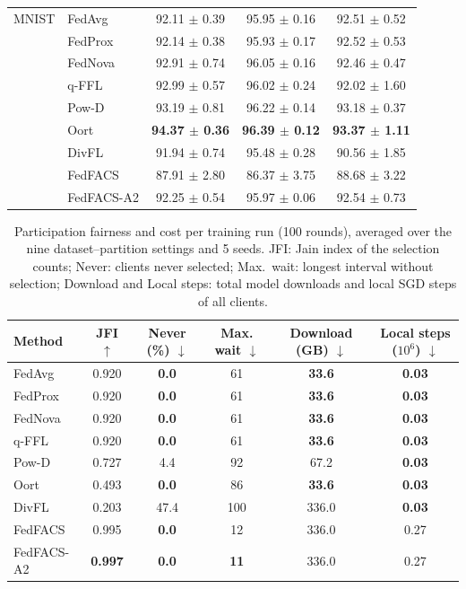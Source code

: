 \begin{table}[!htbp]
\begin{tabular*}{\journalfloatwidth}{@{\extracolsep{\fill}}llccc@{}}
\midrule
MNIST & FedAvg & 92.11 $\pm$ 0.39 & 95.95 $\pm$ 0.16 & 92.51 $\pm$ 0.52 \\
 & FedProx & 92.14 $\pm$ 0.38 & 95.93 $\pm$ 0.17 & 92.52 $\pm$ 0.53 \\
 & FedNova & 92.91 $\pm$ 0.74 & 96.05 $\pm$ 0.16 & 92.46 $\pm$ 0.47 \\
 & q-FFL & 92.99 $\pm$ 0.57 & 96.02 $\pm$ 0.24 & 92.02 $\pm$ 1.60 \\
 & Pow-D & 93.19 $\pm$ 0.81 & 96.22 $\pm$ 0.14 & 93.18 $\pm$ 0.37 \\
 & Oort & \textbf{94.37 $\pm$ 0.36} & \textbf{96.39 $\pm$ 0.12} & \textbf{93.37 $\pm$ 1.11} \\
 & DivFL & 91.94 $\pm$ 0.74 & 95.48 $\pm$ 0.28 & 90.56 $\pm$ 1.85 \\
 & FedFACS & 87.91 $\pm$ 2.80 & 86.37 $\pm$ 3.75 & 88.68 $\pm$ 3.22 \\
 & FedFACS-A2 & 92.25 $\pm$ 0.54 & 95.97 $\pm$ 0.06 & 92.54 $\pm$ 0.73 \\
\bottomrule
\end{tabular*}
\end{table}

\begin{table}[!htbp]
\centering\footnotesize\setlength{\tabcolsep}{3pt}\renewcommand{\arraystretch}{1.08}
\caption{Participation fairness and cost per training run (100 rounds), averaged over the nine dataset--partition settings and 5 seeds. JFI: Jain index of the selection counts; Never: clients never selected; Max.\ wait: longest interval without selection; Download and Local steps: total model downloads and local SGD steps of all clients.}
\label{tab:main_fair_cost}
\begin{tabular*}{\journalfloatwidth}{@{\extracolsep{\fill}}lccccc@{}}
\toprule
Method & JFI $\uparrow$ & Never (\%) $\downarrow$ & Max. wait $\downarrow$ & Download (GB) $\downarrow$ & Local steps ($10^6$) $\downarrow$ \\
\midrule
FedAvg & 0.920 & \textbf{0.0} & 61 & \textbf{33.6} & \textbf{0.03} \\
FedProx & 0.920 & \textbf{0.0} & 61 & \textbf{33.6} & \textbf{0.03} \\
FedNova & 0.920 & \textbf{0.0} & 61 & \textbf{33.6} & \textbf{0.03} \\
q-FFL & 0.920 & \textbf{0.0} & 61 & \textbf{33.6} & \textbf{0.03} \\
Pow-D & 0.727 & 4.4 & 92 & 67.2 & \textbf{0.03} \\
Oort & 0.493 & \textbf{0.0} & 86 & \textbf{33.6} & \textbf{0.03} \\
DivFL & 0.203 & 47.4 & 100 & 336.0 & \textbf{0.03} \\
FedFACS & 0.995 & \textbf{0.0} & 12 & 336.0 & 0.27 \\
FedFACS-A2 & \textbf{0.997} & \textbf{0.0} & \textbf{11} & 336.0 & 0.27 \\
\bottomrule
\end{tabular*}
\end{table}
